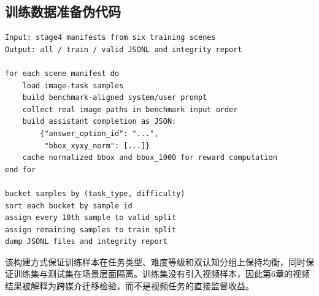 \begin{thesisappendix}
\subsection{训练数据准备伪代码}

\begin{verbatim}
Input: stage4 manifests from six training scenes
Output: all / train / valid JSONL and integrity report

for each scene manifest do
    load image-task samples
    build benchmark-aligned system/user prompt
    collect real image paths in benchmark input order
    build assistant completion as JSON:
        {"answer_option_id": "...",
         "bbox_xyxy_norm": [...]}
    cache normalized bbox and bbox_1000 for reward computation
end for

bucket samples by (task_type, difficulty)
sort each bucket by sample id
assign every 10th sample to valid split
assign remaining samples to train split
dump JSONL files and integrity report
\end{verbatim}

该构建方式保证训练样本在任务类型、难度等级和双认知分组上保持均衡，同时保证训练集与测试集在场景层面隔离。训练集没有引入视频样本，因此第6章的视频结果被解释为跨媒介迁移检验，而不是视频任务的直接监督收益。
\end{thesisappendix}

